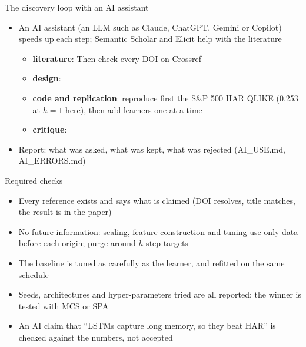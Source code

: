 \begin{frame}{The discovery loop with an AI assistant}
\itemsize{\footnotesize}
\begin{itemize}
    \item An AI assistant (an LLM such as Claude, ChatGPT, Gemini or Copilot) speeds up each step; Semantic Scholar and Elicit help with the literature
    \begin{itemize}
        \item \textbf{literature}:  Then check every DOI on Crossref
        \item \textbf{design}: 
        \item \textbf{code and replication}: reproduce first the S\&P 500 HAR QLIKE (0.253 at $h = 1$ here), then add learners one at a time
        \item \textbf{critique}: 
    \end{itemize}
    \item Report: what was asked, what was kept, what was rejected (AI\_USE.md, AI\_ERRORS.md)
\end{itemize}
\end{frame}

\begin{frame}{Required checks}
\itemsize{\small}
\begin{itemize}
    \item Every reference exists and says what is claimed (DOI resolves, title matches, the result is in the paper)
    \item No future information: scaling, feature construction and tuning use only data before each origin; purge around $h$-step targets
    \item The baseline is tuned as carefully as the learner, and refitted on the same schedule
    \item Seeds, architectures and hyper-parameters tried are all reported; the winner is tested with MCS or SPA
    \item An AI claim that ``LSTMs capture long memory, so they beat HAR'' is checked against the numbers, not accepted
\end{itemize}
\end{frame}

